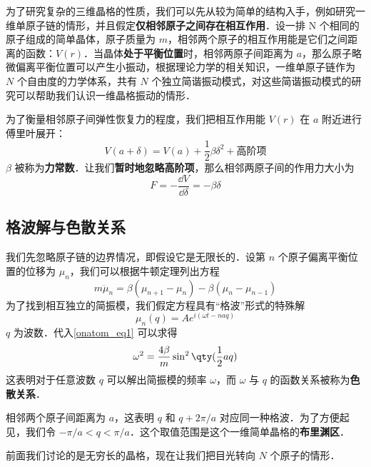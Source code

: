 
为了研究复杂的三维晶格的性质，我们可以先从较为简单的结构入手，例如研究一维单原子链的情形，并且假定\textbf{仅相邻原子之间存在相互作用}．设一排 N 个相同的原子组成的简单晶体，原子质量为 $m$，相邻两个原子的相互作用能是它们之间距离的函数：$V(r)$．当晶体\textbf{处于平衡位置}时，相邻两原子间距离为 $a$，那么原子略微偏离平衡位置可以产生小振动，根据理论力学的相关知识，一维单原子链作为 $N$ 个自由度的力学体系，共有 $N$ 个独立简谐振动模式，对这些简谐振动模式的研究可以帮助我们认识一维晶格振动的情形．

为了衡量相邻原子间弹性恢复力的程度，我们把相互作用能 $V(r)$ 在 $a$ 附近进行傅里叶展开：
\begin{equation}
V(a+\delta)=V(a)+\frac{1}{2}\beta \delta^2+\text{高阶项}
\end{equation}
$\beta$ 被称为\textbf{力常数}．让我们\textbf{暂时地忽略高阶项}，那么相邻两原子间的作用力大小为
\begin{equation}
F=-\frac{\dd V}{\dd \delta}=-\beta\delta
\end{equation}

\subsection{格波解与色散关系}
我们先忽略原子链的边界情况，即假设它是无限长的．设第 $n$ 个原子偏离平衡位置的位移为 $\mu_n$，我们可以根据牛顿定理列出方程
\begin{equation}\label{onatom_eq1}
m \ddot \mu_n = \beta(\mu_{n+1}-\mu_n)-\beta(\mu_n - \mu_{n-1})
\end{equation}
为了找到相互独立的简振模，我们假定方程具有“格波”形式的特殊解
\begin{equation}
\mu_{n}(q)=Ae^{i(\omega t-naq)}
\end{equation}
$q$ 为波数．代入\autoref{onatom_eq1} 可以求得
\begin{equation}
\omega^2=\frac{4\beta}{m}\sin^2 \qty(\frac{1}{2}aq)
\end{equation}
这表明对于任意波数 $q$ 可以解出简振模的频率 $\omega$，而 $\omega$ 与 $q$ 的函数关系被称为\textbf{色散关系}．

相邻两个原子间距离为 $a$，这表明 $q$ 和 $q+2\pi/a$ 对应同一种格波．为了方便起见，我们令 $-\pi/a<q<\pi/a$．这个取值范围是这个一维简单晶格的\textbf{布里渊区}．

前面我们讨论的是无穷长的晶格，现在让我们把目光转向 $N$ 个原子的情形．
